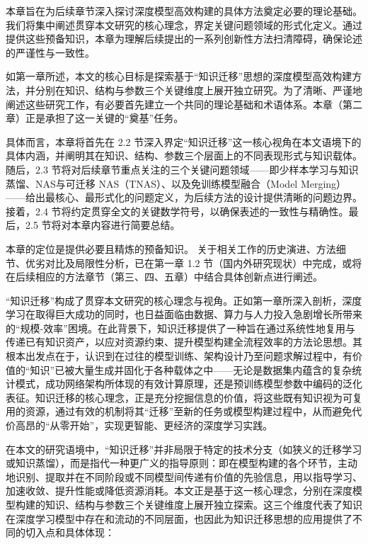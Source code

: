 \documentclass[../main.tex]{subfiles}
\begin{document}
\label{sec:ch2-preliminary}

本章旨在为后续章节深入探讨深度模型高效构建的具体方法奠定必要的理论基础。我们将集中阐述贯穿本文研究的核心理念，界定关键问题领域的形式化定义。通过提供这些预备知识，本章为理解后续提出的一系列创新性方法扫清障碍，确保论述的严谨性与一致性。


如第一章所述，本文的核心目标是探索基于“知识迁移”思想的深度模型高效构建方法，并分别在知识、结构与参数三个关键维度上展开独立研究。为了清晰、严谨地阐述这些研究工作，有必要首先建立一个共同的理论基础和术语体系。本章（第二章）正是承担了这一关键的“奠基”任务。

具体而言，本章将首先在 2.2 节深入界定“知识迁移”这一核心视角在本文语境下的具体内涵，并阐明其在知识、结构、参数三个层面上的不同表现形式与知识载体。随后，2.3 节将对后续章节重点关注的三个关键问题领域——即少样本学习与知识蒸馏、NAS与可迁移 NAS（TNAS）、以及免训练模型融合（Model Merging）——给出最核心、最形式化的问题定义，为后续方法的设计提供清晰的问题边界。接着，2.4 节将约定贯穿全文的关键数学符号，以确保表述的一致性与精确性。最后，2.5 节将对本章内容进行简要总结。

本章的定位是提供必要且精炼的预备知识。 关于相关工作的历史演进、方法细节、优劣对比及局限性分析，已在第一章 1.2 节（国内外研究现状）中完成，或将在后续相应的方法章节（第三、四、五章）中结合具体创新点进行阐述。


“知识迁移”构成了贯穿本文研究的核心理念与视角。正如第一章所深入剖析，深度学习在取得巨大成功的同时，也日益面临由数据、算力与人力投入急剧增长所带来的“规模-效率”困境。在此背景下，知识迁移提供了一种旨在通过系统性地复用与传递已有知识资产，以应对资源约束、提升模型构建全流程效率的方法论思想。其根本出发点在于，认识到在过往的模型训练、架构设计乃至问题求解过程中，有价值的“知识”已被大量生成并固化于各种载体之中——无论是数据集内蕴含的复杂统计模式，成功网络架构所体现的有效计算原理，还是预训练模型参数中编码的泛化表征。知识迁移的核心理念，正是充分挖掘信息的价值，将这些既有知识视为可复用的资源，通过有效的机制将其“迁移”至新的任务或模型构建过程中，从而避免代价高昂的“从零开始”，实现更智能、更经济的深度学习实践。

在本文的研究语境中，“知识迁移”并非局限于特定的技术分支（如狭义的迁移学习或知识蒸馏），而是指代一种更广义的指导原则：即在模型构建的各个环节，主动地识别、提取并在不同阶段或不同模型间传递有价值的先验信息，用以指导学习、加速收敛、提升性能或降低资源消耗。本文正是基于这一核心理念，分别在深度模型构建的知识、结构与参数三个关键维度上展开独立探索。这三个维度代表了知识在深度学习模型中存在和流动的不同层面，也因此为知识迁移思想的应用提供了不同的切入点和具体体现：
\end{document}
